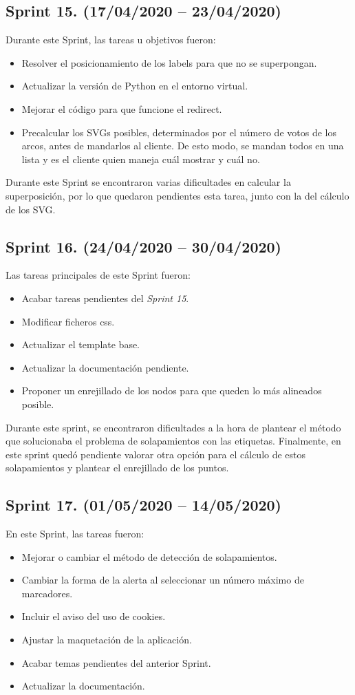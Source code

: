 \subsection{Sprint 15. (17/04/2020 -- 23/04/2020)}
Durante este Sprint, las tareas u objetivos fueron:
\begin{itemize}
	\item Resolver el posicionamiento de los labels para que no se superpongan.
	\item Actualizar la versión de Python en el entorno virtual.
	\item Mejorar el código para que funcione el redirect.
	\item Precalcular los SVGs posibles, determinados por el número de votos de los arcos, antes de mandarlos al cliente. De esto modo, se mandan todos en una lista y es el cliente quien maneja cuál mostrar y cuál no.
\end{itemize}
Durante este Sprint se encontraron varias dificultades en calcular la superposición, por lo que quedaron pendientes esta tarea, junto con la del cálculo de los SVG.

\subsection{Sprint 16. (24/04/2020 -- 30/04/2020)}
Las tareas principales de este Sprint fueron:
\begin{itemize}
	\item Acabar tareas pendientes del \textit{Sprint 15}.
	\item Modificar ficheros css.
	\item Actualizar el template base.
	\item Actualizar la documentación pendiente.
	\item Proponer un enrejillado de los nodos para que queden lo más alineados posible.
\end{itemize}
Durante este sprint, se encontraron dificultades a la hora de plantear el método que solucionaba el problema de solapamientos con las etiquetas. Finalmente, en este sprint quedó pendiente valorar otra opción para el cálculo de estos solapamientos y plantear el enrejillado de los puntos.

\subsection{Sprint 17. (01/05/2020 -- 14/05/2020)}
En este Sprint, las tareas fueron:
\begin{itemize}
	\item Mejorar o cambiar el método de detección de solapamientos.
	\item Cambiar la forma de la alerta al seleccionar un número máximo de marcadores.
	\item Incluir el aviso del uso de cookies.
	\item Ajustar la maquetación de la aplicación.
	\item Acabar temas pendientes del anterior Sprint.
	\item Actualizar la documentación.
\end{itemize}


